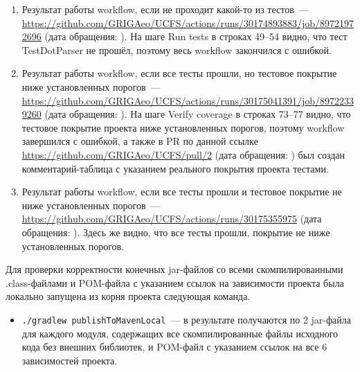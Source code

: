 \documentclass[a4paper]{article}
\begin{document}
\begin{enumerate}
    \item Результат работы workflow, если не проходит какой-то из тестов~--- \url{https://github.com/GRIGAeo/UCFS/actions/runs/30174893883/job/89721972696} (дата обращения: ). На шаге Run tests в строках 49--54 видно, что тест TestDotParser не прошёл, поэтому весь workflow закончился с ошибкой.
    \item Результат работы workflow, если все тесты прошли, но тестовое покрытие ниже установленных порогов~--- \url{https://github.com/GRIGAeo/UCFS/actions/runs/30175041391/job/89722339260} (дата обращения: ). На шаге Verify coverage в строках 73--77 видно, что тестовое покрытие проекта ниже установленных порогов, поэтому workflow завершился с ошибкой, а также в PR по данной ссылке \url{https://github.com/GRIGAeo/UCFS/pull/2} (дата обращения: ) был создан комментарий-таблица с указанием реального покрытия проекта тестами.
    \item Результат работы workflow, если все тесты прошли и тестовое покрытие не ниже установленных порогов~--- \url{https://github.com/GRIGAeo/UCFS/actions/runs/30175355975} (дата обращения: ). Здесь же видно, что все тесты прошли, покрытие не ниже установленных порогов.
\end{enumerate}

Для проверки корректности конечных jar-файлов со всеми скомпилированными .class-файлами и POM-файла с указанием ссылок на зависимости проекта была локально запущена из корня проекта следующая команда.
\begin{itemize}
    \item \verb|./gradlew publishToMavenLocal|~--- в результате получаются по 2 jar-файла для каждого модуля, содержащих все скомпилированные файлы исходного кода без внешних библиотек, и POM-файл с указанием ссылок на все 6 зависимостей проекта.
\end{itemize}
\end{document}
